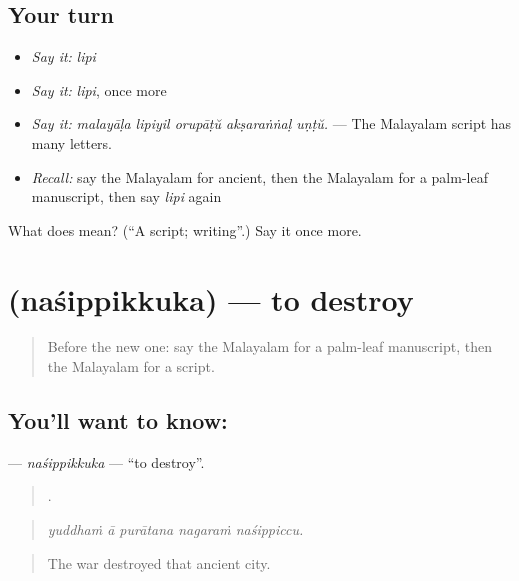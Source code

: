 \subsection*{Your turn}
\begin{itemize}
\raggedright
  \item \emph{Say it:} \emph{lipi}
  \item \emph{Say it:} \emph{lipi}, once more
  \item \emph{Say it:} \emph{malayāḷa lipiyil orupāṭŭ akṣaraṅṅaḷ uṇṭŭ.} — The Malayalam script has many letters.
  \item \emph{Recall:} say the Malayalam for ancient, then the Malayalam for a palm-leaf manuscript, then say \emph{lipi} again
\end{itemize}

\begin{tcolorbox}[breakable,colback=teal!4,colframe=teal!35!black,title={Before you move on}]
What does  mean? (\textquotedblleft{}A script; writing\textquotedblright{}.) Say it once more.
\end{tcolorbox}
\section[\texorpdfstring{\ml{നശിപ്പിക്കുക} (naśippikkuka)}{നശിപ്പിക്കുക (naśippikkuka)}]{ (naśippikkuka) — to destroy}

\label{lesson:ML-C404-nasippikkuka}



\begin{quote}
Before the new one: say the Malayalam for a palm-leaf manuscript, then the Malayalam for a script.
\end{quote}

\subsection*{You'll want to know: }
\textbf{} — \emph{naśippikkuka} — \textquotedblleft{}to destroy\textquotedblright{}.

\begin{quote}
    .
\end{quote}

\begin{quote}
\emph{yuddhaṁ ā purātana nagaraṁ naśippiccu.}
\end{quote}

\begin{quote}
The war destroyed that ancient city.
\end{quote}

